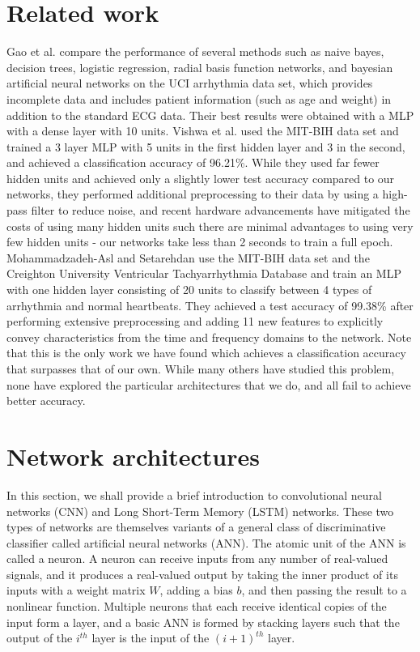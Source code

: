 \documentclass{article} %
\begin{document}
\section{Related work}
Gao et al. \cite{Gao} compare the performance of several methods such as naive bayes, decision trees, logistic regression, radial basis function networks, and bayesian artificial neural networks on the UCI arrhythmia data set, which provides incomplete data and includes patient information (such as age and weight) in addition to the standard ECG data. Their best results were obtained with a MLP with a dense layer with 10 units. Vishwa et al. \cite{Vishwa} used the MIT-BIH data set and trained a 3 layer MLP with 5 units in the first hidden layer and 3 in the second, and achieved a classification accuracy of 96.21\%. While they used far fewer hidden units and achieved only a slightly lower test accuracy compared to our networks, they performed additional preprocessing to their data by using a high-pass filter to reduce noise, and recent hardware advancements have mitigated the costs of using many hidden units such there are minimal advantages to using very few hidden units - our networks take less than 2 seconds to train a full epoch. Mohammadzadeh-Asl and Setarehdan \cite{Babak} use the MIT-BIH data set and the Creighton University Ventricular Tachyarrhythmia Database and train an MLP with one hidden layer consisting of 20 units to classify between 4 types of arrhythmia and normal heartbeats. They achieved a test accuracy of 99.38\% after performing extensive preprocessing and adding 11 new features to explicitly convey characteristics from the time and frequency domains to the network. Note that this is the only work we have found which achieves a classification accuracy that surpasses that of our own. While many others \cite{Ramirez} \cite{Nashash} \cite{Mitra} have studied this problem, none have explored the particular architectures that we do, and all fail to achieve better accuracy.

\section{Network architectures}
In this section, we shall provide a brief introduction to convolutional neural networks (CNN) and Long Short-Term Memory (LSTM) networks. These two types of networks are themselves variants of a general class of discriminative classifier called artificial neural networks (ANN). The atomic unit of the ANN is called a neuron. A neuron can receive inputs from any number of real-valued signals, and it produces a real-valued output by taking the inner product of its inputs with a weight matrix $W$, adding a bias $b$, and then passing the result to a nonlinear function. Multiple neurons that each receive identical copies of the input form a layer, and a basic ANN is formed by stacking layers such that the output of the $i^{th}$ layer is the input of the $(i+1)^{th}$ layer. 
\end{document}
